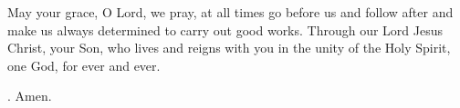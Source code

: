 \lettrine[lines=3]{M}{}ay your grace, O Lord, we pray, at all times go before us and follow after and make us always determined to carry out good works. Through our Lord Jesus Christ, your Son, who lives and reigns with you in the unity of the Holy Spirit, one God, for ever and ever. \par \Rbar. Amen.
